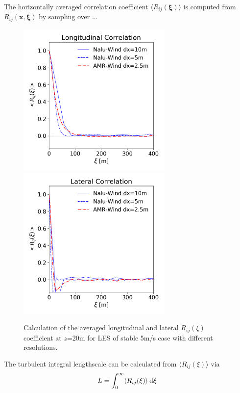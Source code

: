 The horizontally averaged correlation coefficient $\langle
R_{ij}(\boldsymbol{\xi})\rangle$ is computed from
$R_{ij}(\mathbf{x},\boldsymbol{\xi})$ by sampling over ...

\begin{figure}[hbt!]
  \label{fig:GridStudyRij}
  \centering
  \includegraphics[width=3in]{figures/GridStudy_Rij_Longitudinal.png}
  \includegraphics[width=3in]{figures/GridStudy_Rij_Lateral.png}
  \caption{Calculation of the averaged longitudinal and lateral
    $R_{ij}(\xi)$ coefficient at $z$=20m for LES of stable 5m/s case
    with different resolutions.}
\end{figure}


The turbulent integral lengthscale can be calculated from $\langle
R_{ij}(\xi) \rangle$ via
\begin{equation}
  L = \int_0^\infty \langle R_{ij}(\xi) \rangle \: {\textrm d}\xi
\end{equation}

